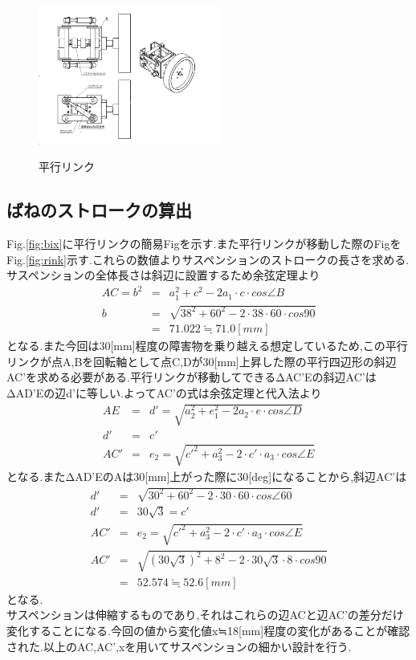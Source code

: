 \documentclass[a4paper]{jarticle}
\begin{document}
\begin{figure}[htbt]
 \begin{center}
  \includegraphics[width=60mm]{img/fig4.png}
 　\caption{平行リンク}
  \label{fig:box}%
 \end{center}
\end{figure}

\subsection{ばねのストロークの算出}
Fig.\ref{fig:bix}に平行リンクの簡易Figを示す.また平行リンクが移動した際のFigをFig.\ref{fig:rink}示す.これらの数値よりサスペンションのストロークの長さを求める.サスペンションの全体長さは斜辺に設置するため余弦定理より
\begin{eqnarray}
   AC = b^2 & = & a_1^2+c^2-2a_1\cdot c\cdot cos\angle B \\
  b & = & \sqrt{38^2+60^2-2\cdot 38\cdot 60\cdot cos90} \\
    & = &71.022 ≒　71.0[mm]
\end{eqnarray}
となる.また今回は30[mm]程度の障害物を乗り越える想定しているため,この平行リンクが点A,Bを回転軸として点C,Dが30[mm]上昇した際の平行四辺形の斜辺AC'を求める必要がある.平行リンクが移動してできるΔAC'Eの斜辺AC'はΔAD'Eの辺d'に等しい.よってAC'の式は余弦定理と代入法より
\begin{eqnarray}
	AE& = &d' =  \sqrt{a_2^2+e_1^2-2a_2\cdot e\cdot cos\angle D} \\
	d' & = & c' \\
	AC'&= &e_2  =  \sqrt{c'^2+a_3^2-2\cdot c'\cdot a_3\cdot cos\angle E}
\end{eqnarray}
となる.またΔAD'Eの\angle Aは30[mm]上がった際に30[deg]になることから,斜辺AC'は
\begin{eqnarray}
	d' &=& \sqrt{30^2+60^2-2\cdot 30\cdot 60\cdot cos\angle 60} \\
	d'&=&30\sqrt{3}=c' \\
	AC'&= &e_2  =  \sqrt{c'^2+a_3^2-2\cdot c'\cdot a_3\cdot cos\angle E}  \\
	AC' &=& \sqrt{(30\sqrt{3})^2+8^2-2\cdot 30\sqrt{3}\cdot 8\cdot cos90} \\
	& = & 52.574 ≒ 52.6 [mm]
\end{eqnarray}
となる.　\\
サスペンションは伸縮するものであり,それはこれらの辺ACと辺AC'の差分だけ変化することになる.今回の値から変化値x≒18[mm]程度の変化があることが確認された.以上のAC,AC',xを用いてサスペンションの細かい設計を行う.
\end{document}
